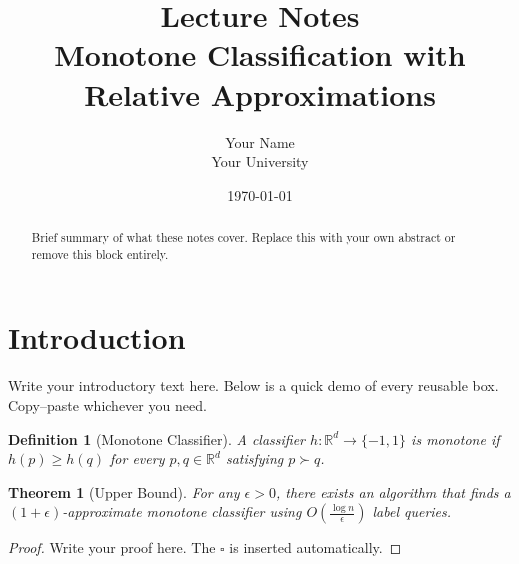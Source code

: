 \documentclass[11pt, a4paper]{article}
\theoremstyle{boxed}
\newtheorem{innerdefinition}{Definition}[section]
\newtheorem{innertheorem}{Theorem}[section]
\newenvironment{definition}
  {\begin{mdframed}[style=defstyle]\begin{innerdefinition}}
  {\end{innerdefinition}\end{mdframed}}
\newenvironment{theorem}
  {\begin{mdframed}[style=thmstyle]\begin{innertheorem}}
  {\end{innertheorem}\end{mdframed}}
\newcommand{\R}{\mathbb{R}}
\newcommand{\dom}{\succ}        %
\begin{document}
\title{\textbf{Lecture Notes}\\[4pt]
       \large Monotone Classification with Relative Approximations}
\author{Your Name \\ \small Your University}
\date{\today}
\maketitle

\begin{abstract}
  Brief summary of what these notes cover.
  Replace this with your own abstract or remove this block entirely.
\end{abstract}

\tableofcontents
\newpage

\section{Introduction}

Write your introductory text here. Below is a quick demo of every
reusable box. Copy–paste whichever you need.

\begin{definition}[Monotone Classifier]
  A classifier $h : \R^d \to \{-1,1\}$ is \emph{monotone} if
  $h(p) \ge h(q)$ for every $p,q \in \R^d$ satisfying $p \dom q$.
\end{definition}

\begin{theorem}[Upper Bound]\label{thm:upper}
  For any $\epsilon > 0$, there exists an algorithm that finds a
  $(1+\epsilon)$-approximate monotone classifier using
  $O\!\left(\frac{\log n}{\epsilon}\right)$ label queries.
\end{theorem}

\begin{proof}
  Write your proof here. The $\square$ is inserted automatically.
\end{proof}
\end{document}
